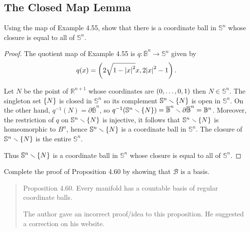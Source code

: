 \subsection*{The Closed Map Lemma}

\begin{exercise}{4.58}
	Using the map of Example 4.55, show that there is a coordinate ball in $\mathbb{S}^{n}$ whose closure is equal to all of $\mathbb{S}^{n}$.
\end{exercise}

\begin{proof}
	The quotient map of Example 4.55 is $q: {\overline{\mathbb{B}}}^{n} \to \mathbb{S}^{n}$ given by
	\begin{equation*}
		q(x) = \left({2\sqrt{1 - {\left\vert{x}\right\vert}^{2}}x, 2{\left\vert{x}\right\vert}^{2} - 1}\right).
	\end{equation*}

	Let $N$ be the point of $\mathbb{R}^{n+1}$ whose coordinates are $\left({0, \ldots, 0, 1}\right)$ then $N\in \mathbb{S}^{n}$. The singleton set $\left\{{N}\right\}$ is closed in $\mathbb{S}^{n}$ so its complement $\mathbb{S}^{n}\smallsetminus \left\{{N}\right\}$ is open in $\mathbb{S}^{n}$. On the other hand, $q^{-1}(N) = \partial{\overline{\mathbb{B}}}^{n}$, so $q^{-1}(\mathbb{S}^{n}\smallsetminus \left\{{N}\right\}) = {\overline{\mathbb{B}}}^{n} \smallsetminus \partial{\overline{\mathbb{B}}}^{n} = \mathbb{B}^{n}$. Moreover, the restriction of $q$ on $\mathbb{S}^{n}\smallsetminus \left\{{N}\right\}$ is injective, it follows that $\mathbb{S}^{n}\smallsetminus \left\{{N}\right\}$ is homeomorphic to $B^{n}$, hence $\mathbb{S}^{n}\smallsetminus \left\{{N}\right\}$ is a coordinate ball in $\mathbb{S}^{n}$. The closure of $\mathbb{S}^{n}\smallsetminus \left\{{N}\right\}$ is the entire $\mathbb{S}^{n}$.

	Thus $\mathbb{S}^{n}\smallsetminus \left\{{N}\right\}$ is a coordinate ball in $\mathbb{S}^{n}$ whose closure is equal to all of $\mathbb{S}^{n}$.
\end{proof}

\begin{exercise}{4.61}\label{exercise:4.61}
	Complete the proof of Proposition 4.60 by showing that $\mathscr{B}$ is a basis.
\end{exercise}

\begin{quotation}
	Proposition 4.60. Every manifold has a countable basis of regular coordinate balls.

	The author gave an incorrect proof/idea to this proposition. He suggested a correction on his website.
\end{quotation}

